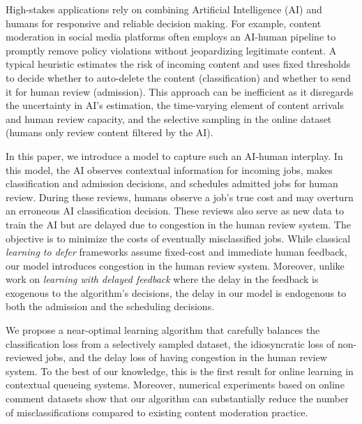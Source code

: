High-stakes applications rely on combining Artificial Intelligence (AI) and humans for responsive and reliable decision making. For example, content moderation in social media platforms often employs an AI-human pipeline to promptly remove policy violations without jeopardizing legitimate content. A typical heuristic estimates the risk of incoming content and uses fixed thresholds to decide whether to auto-delete the content (classification) and whether to send it for human review (admission). This approach can be inefficient as it disregards the uncertainty in AI's estimation, the time-varying element of content arrivals and human review capacity, and the selective sampling in the online dataset (humans only review content filtered by the AI). 

In this paper, we introduce a model to capture such an AI-human interplay. In this model, the AI observes contextual information for incoming jobs, makes classification and admission decisions, and schedules admitted jobs for human review. During these reviews, humans observe a job's true cost and may overturn an erroneous AI classification decision. These reviews also serve as new data to train the AI but are delayed due to congestion in the human review system. The objective is to minimize the costs of eventually misclassified jobs. While classical \emph{learning to defer} frameworks assume fixed-cost and immediate human feedback, our model introduces congestion in the human review system. Moreover, unlike work on \emph{learning with delayed feedback} where the delay in the feedback is exogenous to the algorithm's decisions, the delay in our model is endogenous to both the admission and the scheduling decisions. 

We propose a near-optimal learning algorithm that carefully balances the classification loss from a selectively sampled dataset, the idiosyncratic loss of non-reviewed jobs, and the delay loss of having congestion in the human review system. To the best of our knowledge, this is the first result for online learning in contextual queueing systems. Moreover, numerical experiments based on online comment datasets show that our algorithm can substantially reduce the number of misclassifications compared to existing content moderation practice.
